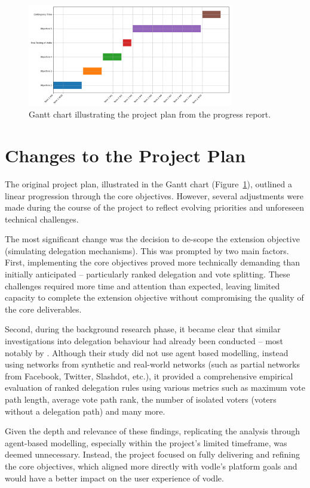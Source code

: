 \begin{figure}[H]
    \centering
    \includegraphics[width=0.8\textwidth]{../common/initial_gantt.png}
    \caption{Gantt chart illustrating the project plan from the progress report.}
    \label{fig:gantt}
\end{figure}


\section{Changes to the Project Plan}
The original project plan, illustrated in the Gantt chart (Figure~\ref{fig:gantt}), outlined a linear progression through the core objectives. However, several adjustments were made during the course of the project to reflect evolving priorities and unforeseen technical challenges.

The most significant change was the decision to de-scope the extension objective (simulating delegation mechanisms). This was prompted by two main factors. First, implementing the core objectives proved more technically demanding than initially anticipated -- particularly ranked delegation and vote splitting. These challenges required more time and attention than expected, leaving limited capacity to complete the extension objective without compromising the quality of the core deliverables.

Second, during the background research phase, it became clear that similar investigations into delegation behaviour had already been conducted -- most notably by \citet{brill_liquid_2021}. Although their study did not use agent based modelling, instead using networks from synthetic and real-world networks (such as partial networks from Facebook, Twitter, Slashdot, etc.), it provided a comprehensive empirical evaluation of ranked delegation rules using various metrics such as maximum vote path length, average vote path rank, the number of isolated voters (voters without a delegation path) and many more.

Given the depth and relevance of these findings, replicating the analysis through agent-based modelling, especially within the project's limited timeframe, was deemed unnecessary. Instead, the project focused on fully delivering and refining the core objectives, which aligned more directly with vodle's platform goals and would have a better impact on the user experience of vodle.

